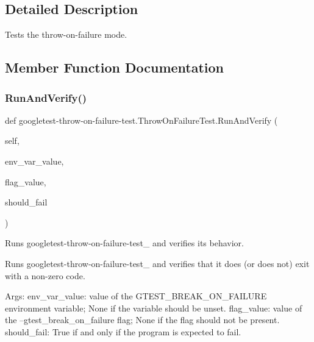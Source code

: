 \subsection{Detailed Description}
\begin{DoxyVerb}Tests the throw-on-failure mode.\end{DoxyVerb}
 

\subsection{Member Function Documentation}
\mbox{\label{classgoogletest-throw-on-failure-test_1_1ThrowOnFailureTest_ac9966623ba3bbd94be99aef689db43f3}} 
\subsubsection{\texorpdfstring{Run\+And\+Verify()}{RunAndVerify()}}
{\footnotesize\ttfamily def googletest-\/throw-\/on-\/failure-\/test.\+Throw\+On\+Failure\+Test.\+Run\+And\+Verify (\begin{DoxyParamCaption}\item[{}]{self,  }\item[{}]{env\+\_\+var\+\_\+value,  }\item[{}]{flag\+\_\+value,  }\item[{}]{should\+\_\+fail }\end{DoxyParamCaption})}

\begin{DoxyVerb}Runs googletest-throw-on-failure-test_ and verifies its behavior.

Runs googletest-throw-on-failure-test_ and verifies that it does
(or does not) exit with a non-zero code.

Args:
  env_var_value:    value of the GTEST_BREAK_ON_FAILURE environment
variable; None if the variable should be unset.
  flag_value:       value of the --gtest_break_on_failure flag; None if the
flag should not be present.
  should_fail:      True if and only if the program is expected to fail.
\end{DoxyVerb}
 \mbox{\label{classgoogletest-throw-on-failure-test_1_1ThrowOnFailureTest_a55494f56e9674d086077e82583e8f823}} 
